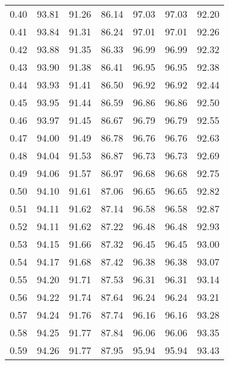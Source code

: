 \begin{tabular}{|c|c|c|c|c|c|c|}
      0.40 &     93.81 &     91.26 &      86.14 &   97.03 &      97.03 &         92.20 \\
      0.41 &     93.84 &     91.31 &      86.24 &   97.01 &      97.01 &         92.26 \\
      0.42 &     93.88 &     91.35 &      86.33 &   96.99 &      96.99 &         92.32 \\
      0.43 &     93.90 &     91.38 &      86.41 &   96.95 &      96.95 &         92.38 \\
      0.44 &     93.93 &     91.41 &      86.50 &   96.92 &      96.92 &         92.44 \\
      0.45 &     93.95 &     91.44 &      86.59 &   96.86 &      96.86 &         92.50 \\
      0.46 &     93.97 &     91.45 &      86.67 &   96.79 &      96.79 &         92.55 \\
      0.47 &     94.00 &     91.49 &      86.78 &   96.76 &      96.76 &         92.63 \\
      0.48 &     94.04 &     91.53 &      86.87 &   96.73 &      96.73 &         92.69 \\
      0.49 &     94.06 &     91.57 &      86.97 &   96.68 &      96.68 &         92.75 \\
      0.50 &     94.10 &     91.61 &      87.06 &   96.65 &      96.65 &         92.82 \\
      0.51 &     94.11 &     91.62 &      87.14 &   96.58 &      96.58 &         92.87 \\
      0.52 &     94.11 &     91.62 &      87.22 &   96.48 &      96.48 &         92.93 \\
      0.53 &     94.15 &     91.66 &      87.32 &   96.45 &      96.45 &         93.00 \\
      0.54 &     94.17 &     91.68 &      87.42 &   96.38 &      96.38 &         93.07 \\
      0.55 &     94.20 &     91.71 &      87.53 &   96.31 &      96.31 &         93.14 \\
      0.56 &     94.22 &     91.74 &      87.64 &   96.24 &      96.24 &         93.21 \\
      0.57 &     94.24 &     91.76 &      87.74 &   96.16 &      96.16 &         93.28 \\
      0.58 &     94.25 &     91.77 &      87.84 &   96.06 &      96.06 &         93.35 \\
      0.59 &     94.26 &     91.77 &      87.95 &   95.94 &      95.94 &         93.43 \\

\end{tabular}
